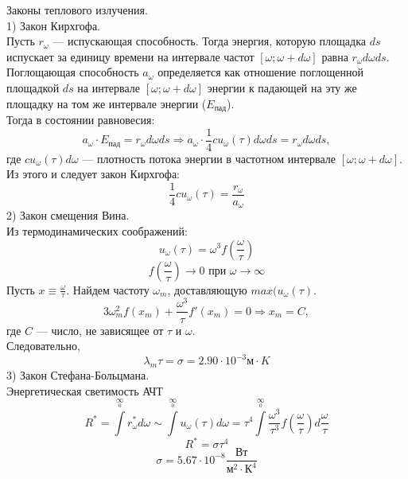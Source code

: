 Законы теплового излучения.\\
1) Закон Кирхгофа.\\
Пусть $r_{\omega}$ --- испускающая способность. Тогда энергия, которую площадка $ds$ испускает за единицу времени на интервале частот $[\omega; \omega+d\omega]$ равна $r_\omega d\omega ds$. \\
Поглощающая способность $a_\omega$ определяется как отношение поглощенной площадкой $ds$ на интервале $[\omega;\omega+d\omega]$ энергии к падающей на эту же площадку на том же интервале энергии ($E_{\text{пад}}$).\\
Тогда в состоянии равновесия:
$$
a_\omega \cdot E_{\text{пад}} = r_\omega d\omega ds \Longrightarrow a_\omega\cdot \frac{1}{4}cu_\omega(\tau)d\omega ds = r_\omega d\omega ds,
$$
где $cu_\omega(\tau)d\omega$ --- плотность потока энергии в частотном интервале $[\omega; \omega+d\omega]$.\\
Из этого и следует закон Кирхгофа:
$$
\frac{1}{4}cu_\omega(\tau)=\frac{r_\omega}{a_\omega}
$$
2) Закон смещения Вина. \\
Из термодинамических соображений:
$$
u_\omega(\tau)=\omega^3f\left(\frac{\omega}{\tau}\right)
$$
$$
f\left(\frac{\omega}{\tau}\right)\longrightarrow 0 \text{  при  } \omega \longrightarrow \infty
$$
Пусть $x\equiv \frac{\omega}{\tau}$. Найдем частоту $\omega_m$, доставляющую $max(u_\omega (\tau)$.
$$
3\omega_m^2f(x_m)+\frac{\omega^3}{\tau}f'(x_m)=0 \Longrightarrow x_m=C, 
$$
где $C$ --- число, не зависящее от $\tau$ и $\omega$.\\
Следовательно,
$$
\lambda_m\tau=\sigma=2.90\cdot 10^{-3}\text{м}\cdot K
$$
3) Закон Стефана-Больцмана.\\
Энергетическая светимость АЧТ
$$
R^*=\int\limits^{\infty}\limits_0 r^*_\omega d\omega \sim \int\limits^{\infty}\limits_0 u_\omega(\tau)d\omega =\tau^4 \int\limits^{\infty}\limits_0 \frac{\omega^3}{\tau^3}f\left(\frac{\omega}{\tau}\right)d\frac{\omega}{\tau}
$$
$$
R^*=\sigma \tau^4
$$
$$
\sigma = 5.67\cdot 10^{-8} \frac{\text{Вт}}{\text{м}^2\cdot \text{К}^4}
$$
